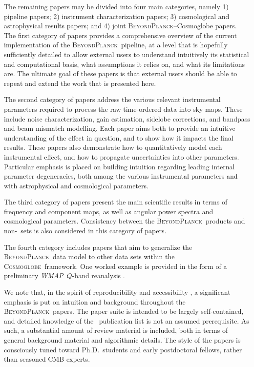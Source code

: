 \documentclass[twocolumn]{aa}
\def\WMAP{\emph{WMAP}}
\newcommand{\BP}{\textsc{BeyondPlanck}}
\newcommand{\cosmoglobe}{\textsc{Cosmoglobe}}
\begin{document}
The remaining papers may be divided into four main categories, namely
1) pipeline papers; 2) instrument characterization papers; 3)
cosmological and astrophysical results papers; and 4) joint
\BP--Cosmoglobe papers.  The first category of papers provides a
comprehensive overview of the current implementation of the
\BP\ pipeline, at a level that is hopefully sufficiently detailed to
allow external users to understand intuitively its statistical and
computational basis, what assumptions it relies on, and what its
limitations are.  The ultimate goal of these papers is that external
users should be able to repeat and extend the work that is presented
here.

The second category of papers address the various relevant
instrumental parameters required to process the raw time-ordered data
into sky maps. These include noise characterization, gain estimation,
sidelobe corrections, and bandpass and beam mismatch modelling. Each
paper aims both to provide an intuitive understanding of the effect in
question, and to show how it impacts the final results.  These papers
also demonstrate how to quantitatively model each instrumental effect,
and how to propagate uncertainties into other parameters. Particular
emphasis is placed on building intuition regarding leading internal
parameter degeneracies, both among the various instrumental parameters
and with astrophysical and cosmological parameters.

The third category of papers present the main scientific results in
terms of frequency and component maps, as well as angular power
spectra and cosmological parameters. Consistency between the
\BP\ products and non-\Planck\ sets is also considered in this
category of papers.

The fourth category includes papers that aim to generalize the
\BP\ data model to other data sets within the
\cosmoglobe\ framework. One worked example is provided in the form of
a preliminary \WMAP\ $Q$-band reanalysis \citep{bp17}.

We note that, in the spirit of reproducibility and accessibility
\citep{bp05}, a significant emphasis is put on intuition and
background throughout the \BP\ papers. The paper suite is intended to
be largely self-contained, and detailed knowledge of the
\Planck\ publication list is not an assumed prerequisite. As such, a
substantial amount of review material is included, both in terms of
general background material and algorithmic details. The style of the
papers is consciously tuned toward Ph.D.\ students and early
postdoctoral fellows, rather than seasoned CMB experts.
\end{document}
